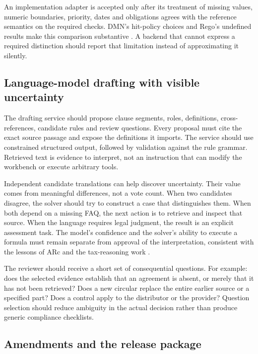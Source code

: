 An implementation adapter is accepted only after its treatment of missing
values, numeric boundaries, priority, dates and obligations agrees with the
reference semantics on the required checks. DMN's hit-policy choices and Rego's
undefined results make this comparison substantive
\citep{dmn2024,opadocs}. A backend that cannot express a required distinction
should report that limitation instead of approximating it silently.



\subsection{Language-model drafting with visible uncertainty}

The drafting service should propose clause segments, roles, definitions,
cross-references, candidate rules and review questions. Every proposal must cite
the exact source passage and expose the definitions it imports. The service
should use constrained structured output, followed by validation against the
rule grammar. Retrieved text is evidence to interpret, not an instruction that
can modify the workbench or execute arbitrary tools.

Independent candidate translations can help discover uncertainty. Their value
comes from meaningful differences, not a vote count. When two candidates disagree,
the solver should try to construct a case that distinguishes them. When both
depend on a missing FAQ, the next action is to retrieve and inspect that source.
When the language requires legal judgment, the result is an explicit assessment
task. The model's confidence and the solver's ability to execute a formula must
remain separate from approval of the interpretation, consistent with the lessons
of ARc and the tax-reasoning work \citep{arc2025,jurayj2026}.

The reviewer should receive a short set of consequential questions. For example:
does the selected evidence establish that an agreement is absent, or merely that
it has not been retrieved? Does a new circular replace the entire earlier source
or a specified part? Does a control apply to the distributor or the provider?
Question selection should reduce ambiguity in the actual decision rather than
produce generic compliance checklists.

\subsection{Amendments and the release package}


